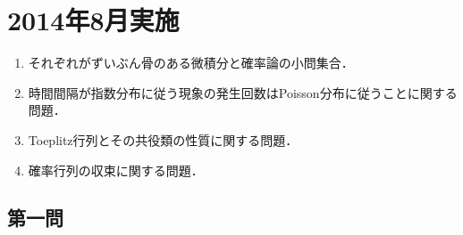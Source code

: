 \documentclass[uplatex,dvipdfmx]{jsarticle}
\begin{document}
\section{2014年8月実施}

\begin{tcolorbox}[colframe=ForestGreen, colback=ForestGreen!10!white,breakable,colbacktitle=ForestGreen!40!white,coltitle=black,fonttitle=\bfseries\sffamily,
    title=概観]
    \begin{enumerate}[{第}1{問}]
        \item それぞれがずいぶん骨のある微積分と確率論の小問集合．
        \item 時間間隔が指数分布に従う現象の発生回数はPoisson分布に従うことに関する問題．
        \item Toeplitz行列とその共役類の性質に関する問題．
        \item 確率行列の収束に関する問題．
    \end{enumerate}
\end{tcolorbox}

\subsection{第一問}
\end{document}
